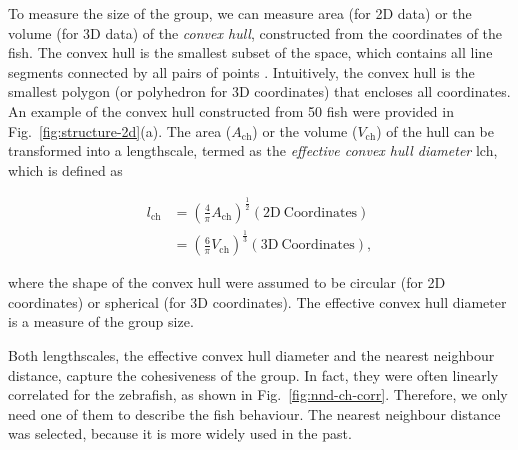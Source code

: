 \documentclass[11pt,twoside]{report}
\begin{document}
To measure the size of the group, we can measure area (for 2D data) or the volume (for 3D data) of the \emph{convex hull}, constructed from the coordinates of the fish. The convex hull is the smallest subset of the space, which contains all line segments connected by all pairs of points \cite{berg2000}. Intuitively, the convex hull is the smallest polygon (or polyhedron for 3D coordinates) that encloses all coordinates. An example of the convex hull constructed from 50 fish were provided in Fig.~\ref{fig:structure-2d}(a). The area ($A_\mathrm{ch}$) or the volume ($V_\mathrm{ch}$) of the hull can be transformed into a lengthscale, termed as the \emph{effective convex hull diameter} \gls{lch}, which is defined as

\begin{equation}
\begin{split}
	l_\mathrm{ch}
	&= \left(
	\frac{4}{\pi} A_\mathrm{ch}
	\right)^\frac12 (\mathrm{2D}\ \mathrm{Coordinates}) \\[1.5ex]
	&= \left(
	\frac{6}{\pi} V_\mathrm{ch}
	\right)^\frac13 (\mathrm{3D}\ \mathrm{Coordinates}),
\end{split}
\label{eq:convex-hull-diameter}
\end{equation}

\noindent where the shape of the convex hull were assumed to be circular (for 2D coordinates) or spherical (for 3D coordinates). The effective convex hull diameter is a measure of the group size.

Both lengthscales, the effective convex hull diameter and the nearest neighbour distance, capture the cohesiveness of the group. In fact, they were often linearly correlated for the zebrafish, as shown in Fig.~\ref{fig:nnd-ch-corr}. Therefore, we only need one of them to describe the fish behaviour. The nearest neighbour distance was selected, because it is more widely used in the past.
\end{document}
